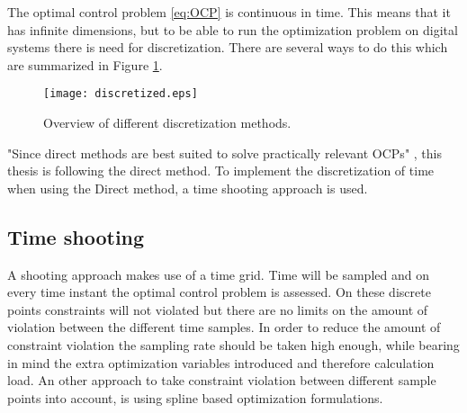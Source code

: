 The optimal control problem \ref{eq:OCP} is continuous in time. This means that it has infinite dimensions, but to be able to run the optimization problem on digital systems there is need for discretization. There are several ways to do this which are summarized in Figure \ref{fig:discretization_m}.\cite{Gillis2019}
\begin{figure}[htp]
	\centering
	\texttt{[image: discretized.eps]}
	\caption{Overview of different discretization methods.}
	\label{fig:discretization_m}
\end{figure}

"Since direct methods are best suited to solve practically relevant OCPs" \cite{Mercy2018}, this thesis is following the direct method. To implement the discretization of time when using the Direct method, a time shooting approach is used.

\subsection{Time shooting}
A shooting approach makes use of a time grid. Time will be sampled and on every time instant the optimal control problem is assessed. On these discrete points constraints will not violated but there are no limits on the amount of violation between the different time samples. In order to reduce the amount of constraint violation the sampling rate should be taken high enough, while bearing in mind the extra optimization variables introduced and therefore calculation load. An other approach to take constraint violation between different sample points into account, is using spline based optimization formulations. \cite{Mercy2018}\\


